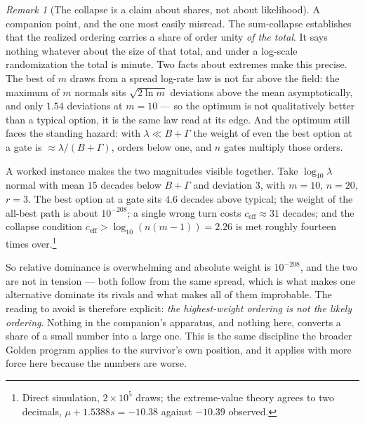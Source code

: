\documentclass[11pt]{article}
\theoremstyle{plain}
\theoremstyle{definition}
\theoremstyle{remark}
\newtheorem{remark}[theorem]{Remark}
\begin{document}
\begin{remark}[The collapse is a claim about shares, not about
likelihood]\label{sch:rem:absolute}
A companion point, and the one most easily misread. The sum-collapse
establishes that the realized ordering carries a share of order unity
\emph{of the total}. It says nothing whatever about the size of that
total, and under a log-scale randomization the total is minute. Two facts about extremes make this precise. The best of $m$ draws from a
spread log-rate law is not far above the field: the maximum of $m$
normals sits $\sqrt{2\ln m}$ deviations above the mean asymptotically,
and only $1.54$ deviations at $m=10$ --- so the optimum is not
qualitatively better than a typical option, it is the same law read at
its edge. And the optimum still faces the standing hazard: with
$\lambda\ll B+\Gamma$ the weight of even the best option at a gate is
$\approx\lambda/(B+\Gamma)$, orders below one, and $n$ gates multiply
those orders.

A worked instance makes the two magnitudes visible together. Take
$\log_{10}\lambda$ normal with mean $15$ decades below $B+\Gamma$ and
deviation $3$, with $m=10$, $n=20$, $r=3$. The best option at a gate
sits $4.6$ decades above typical; the weight of the all-best path is
about $10^{-208}$; a single wrong turn costs $c_{\mathrm{eff}}\approx31$
decades; and the collapse condition $c_{\mathrm{eff}}>\log_{10}(n(m-1))
=2.26$ is met roughly fourteen times over.\footnote{Direct simulation,
$2\times10^{5}$ draws; the extreme-value theory agrees to two decimals,
$\mu+1.5388s=-10.38$ against $-10.39$ observed.}

So relative dominance is overwhelming and absolute weight is
$10^{-208}$, and the two are not in tension --- both follow from the
same spread, which is what makes one alternative dominate its rivals and
what makes all of them improbable. The reading to avoid is therefore
explicit: \emph{the highest-weight ordering is not the likely ordering}.
Nothing in the companion's apparatus, and nothing here, converts a share
of a small number into a large one. This is the same discipline
the broader Golden program applies to the survivor's own position, and
it applies with more force here because the numbers are worse.
\end{remark}
\end{document}
